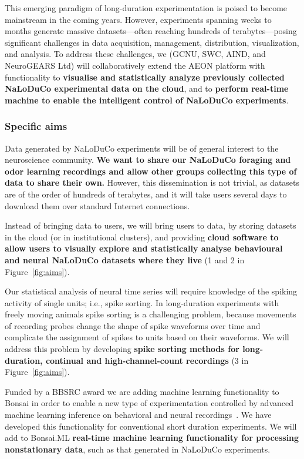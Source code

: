 This emerging paradigm of long-duration experimentation is poised to become
mainstream in the coming years.
%
However, experiments spanning weeks to months generate massive datasets—often
reaching hundreds of terabytes—posing significant challenges in data
acquisition, management, distribution, visualization, and analysis.
%
To address these challenges, we (GCNU, SWC, AIND, and NeuroGEARS Ltd) will
collaboratively extend the AEON platform with functionality to
\textbf{visualise and statistically analyze previously collected NaLoDuCo
experimental data on the cloud}, and to \textbf{perform real-time machine to enable the
intelligent control of NaLoDuCo experiments}.

\subsubsection{Specific aims}

Data generated by NaLoDuCo experiments will be of general interest to the
neuroscience community. \textbf{We want to share our NaLoDuCo foraging and odor
learning recordings and allow other groups collecting this type of data to
share their own.}
%
However, this dissemination is not trivial, as datasets are of the order of
hundreds of terabytes, and it will take users several days to download them
over standard Internet connections.

Instead of bringing data to users, we will bring users to data, by storing
datasets in the cloud (or in institutional clusters), and providing
\textbf{cloud software to allow users to visually explore and statistically
analyse behavioural and neural NaLoDuCo datasets where they live}
(1 and 2 in Figure~\ref{fig:aims}).

Our statistical analysis of neural time series will require knowledge of the
spiking activity of single units; i.e., spike sorting. In long-duration
experiments with freely moving animals spike sorting is a challenging problem,
because movements of recording probes change the shape of spike waveforms over
time and complicate the assignment of spikes to units based on their waveforms.
We will address this problem by developing \textbf{spike sorting methods for
long-duration, continual and high-channel-count recordings} (3 in
Figure~\ref{fig:aims}).

Funded by a BBSRC award we are adding machine learning functionality to Bonsai
in order to enable a new type of experimentation controlled by advanced machine
learning inference on behavioral and neural
recordings~\citep[Bonsai.ML,][]{bonsaiML25}. We have developed this
functionality for conventional short duration experiments. We will add to
Bonsai.ML \textbf{real-time machine learning functionality for processing
nonstationary data}, such as that generated in NaLoDuCo experiments.

